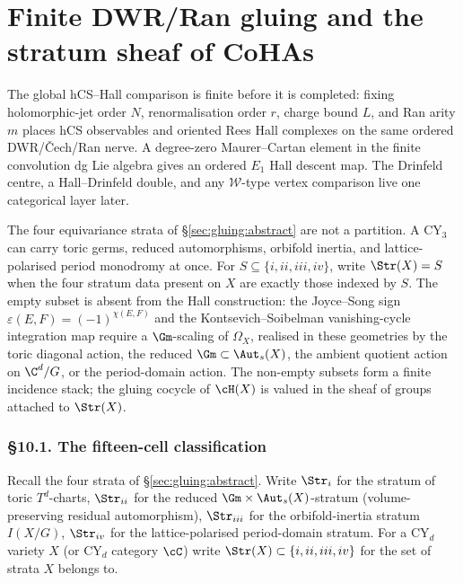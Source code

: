 \section{Finite DWR/Ran gluing and the stratum sheaf of CoHAs}
\label{sec:gluing:unifying}
\label{gluing:part:x-unifying}
The global hCS--Hall comparison is finite before it is completed:
fixing holomorphic-jet order \(N\), renormalisation order \(r\),
charge bound \(L\), and Ran arity \(m\) places hCS observables and
oriented Rees Hall complexes on the same ordered DWR/\v{C}ech/Ran
nerve. A degree-zero Maurer--Cartan element in the finite convolution
dg Lie algebra gives an ordered \(E_1\) Hall descent map. The
Drinfeld centre, a Hall--Drinfeld double, and any \(\mathcal W\)-type
vertex comparison live one categorical layer later.

The four equivariance strata of \S\ref{sec:gluing:abstract} are not a
partition. A CY$_3$ can carry toric germs, reduced automorphisms,
orbifold inertia, and lattice-polarised period monodromy at once. For
\(S\subseteq\{i,ii,iii,iv\}\), write \(\Str(X)=S\) when the four
stratum data present on \(X\) are exactly those indexed by \(S\). The
empty subset is absent from the Hall construction: the Joyce--Song
sign \(\varepsilon(E,F)=(-1)^{\chi(E,F)}\) and the
Kontsevich--Soibelman vanishing-cycle integration map require a
\(\Gm\)-scaling of \(\Omega_X\), realised in these geometries by the
toric diagonal action, the reduced \(\Gm\subset\Aut_s(X)\), the
ambient quotient action on \(\C^d/G\), or the period-domain action.
The non-empty subsets form a finite incidence stack; the gluing
cocycle of \(\cH(X)\) is valued in the sheaf of groups attached to
\(\Str(X)\).

\subsubsection{\S 10.1. The fifteen-cell classification}
\label{gluing:sec:10-1-fifteen-cell}

Recall the four strata of \S\ref{sec:gluing:abstract}. Write $\Str_{i}$ for the stratum of
toric $T^{d}$-charts, $\Str_{ii}$ for the reduced
$\Gm\times\Aut_{s}(X)$-stratum (volume-preserving residual
automorphism), $\Str_{iii}$ for the orbifold-inertia stratum
$I(X/G)$, $\Str_{iv}$ for the lattice-polarised period-domain
stratum. For a CY$_{d}$ variety $X$ (or CY$_{d}$ category $\cC$)
write $\Str(X)\subset\{i,ii,iii,iv\}$ for the set of strata $X$
belongs to.

